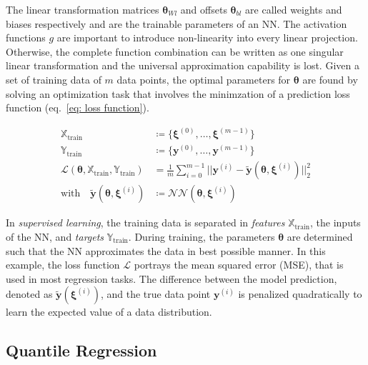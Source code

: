 \noindent
The linear transformation matrices $\bm{\theta}_{Wl}$ and offsets $\bm{\theta}_{bl}$
are called weights and biases respectively and are the trainable parameters of an NN. The activation functions $g$ are important
to introduce non-linearity into every linear projection. Otherwise, the complete function combination can be written as one 
singular linear transformation and the universal approximation capability is lost. Given a set of training data of $m$ data points,
the optimal parameters for $\bm{\theta}$ are found by solving an optimization task that involves the minimzation of a prediction loss function (eq.~\ref{eq: loss function}).

\begin{equation}
    \label{eq: loss function}
    \begin{aligned}
        \mathbb{X}_\text{train} &\coloneq \{ \bm{\xi}^{(0)}, \hdots, \bm{\xi}^{(m-1)} \}
        \\
        \mathbb{Y}_\text{train} &\coloneq \{ \bm{y}^{(0)}, \hdots, \bm{y}^{(m-1)} \} 
        \\
        \mathcal{L}(\bm{\theta}, \mathbb{X}_\text{train}, \mathbb{Y}_\text{train}) &=
        \frac{1}{m} \sum_{i=0}^{m-1} \Big| \Big| \bm{y}^{(i)} - \bm{\tilde{y}}(\bm{\theta}, \bm{\xi}^{(i)}) \Big | \Big|_2^2 \\
        \text{with} \quad \bm{\tilde{y}}(\bm{\theta}, \bm{\xi}^{(i)}) &\coloneq \mathcal{NN}(\bm{\theta}, \bm{\xi}^{(i)})
    \end{aligned}
\end{equation}

\noindent
In \emph{supervised learning}, the training data is separated in \emph{features} $\mathbb{X}_\text{train}$, the inputs of the NN,
and \emph{targets} $\mathbb{Y}_\text{train}$. During training, the parameters $\bm{\theta}$ are determined such that
the NN approximates the data in best possible manner.
In this example, the loss function $\mathcal{L}$ portrays the mean squared error (MSE), that is used in most regression tasks. 
The difference between the model prediction, denoted as $\bm{\tilde{y}}(\bm{\xi}^{(i)})$, and the true data point $\bm{y}^{(i)}$
is penalized quadratically to learn the expected value of a data distribution.

\subsection{Quantile Regression}
\label{theory: quantile regression}


